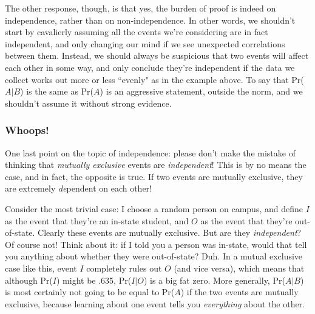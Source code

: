 The other response, though, is that yes, the burden of proof is indeed on
independence, rather than on non-independence. In other words, we shouldn't
start by cavalierly assuming all the events we're considering are in fact
independent, and only changing our mind if we see unexpected correlations
between them. Instead, we should always be suspicious that two events will
affect each other in some way, and only conclude they're independent if the
data we collect works out more or less ``evenly" as in the example above.
To say that Pr($A|B$) is the same as Pr($A$) is an aggressive statement,
outside the norm, and we shouldn't assume it without strong evidence.


\subsubsection{Whoops!}

One last point on the topic of independence: please don't make the mistake of
thinking that \textit{mutually exclusive} events are \textit{independent}! This
is by no means the case, and in fact, the opposite is true. If two events are
mutually exclusive, they are extremely \textit{de}pendent on each other!

Consider the most trivial case: I choose a random person on campus, and define
$I$ as the event that they're an in-state student, and $O$ as the event that
they're out-of-state. Clearly these events are mutually exclusive. But are they
\textit{independent}? Of course not! Think about it: if I told you a person was
in-state, would that tell you anything about whether they were out-of-state?
Duh. In a mutual exclusive case like this, event $I$ completely rules out $O$
(and vice versa), which means that although Pr($I$) might be .635, Pr($I|O$) is
a big fat zero. More generally, Pr($A|B$) is most certainly not going to be
equal to Pr($A$) if the two events are mutually exclusive, because learning
about one event tells you \textit{everything} about the other.





